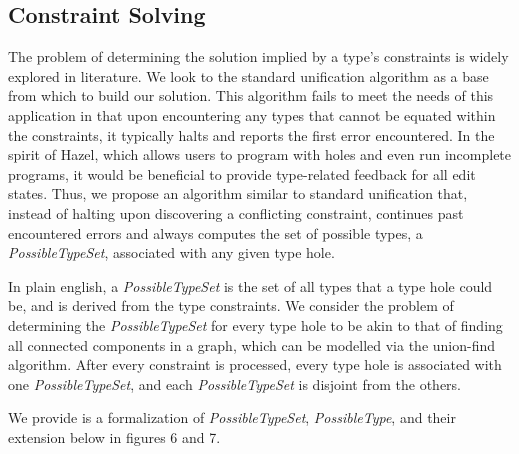 
\usetikzlibrary{positioning,calc}

\subsection{Constraint Solving}
\label{sec:infalg}
The problem of determining the solution implied by a type's constraints is widely explored in literature. We look to the standard unification algorithm \cite{RobinUnification} as a base from which to build our solution. This algorithm fails to meet the needs of this application in that upon encountering any types that cannot be equated within the constraints, it typically halts and reports the first error encountered.
In the spirit of Hazel, which allows users to program with holes and even run incomplete programs, it would be beneficial to provide type-related feedback for all edit states. Thus, we propose an algorithm similar to standard unification that, instead of halting upon discovering a conflicting constraint, continues past encountered errors and always computes the set of possible types, a \textit{PossibleTypeSet}, associated with any given type hole.

In plain english, a \textit{PossibleTypeSet} is the set of all types that a type hole could be, and is derived from the type constraints. We consider the problem of determining the \textit{PossibleTypeSet} for every type hole to be akin to that of finding all connected components in a graph, which can be modelled via the union-find algorithm. After every constraint is processed, every type hole is associated with one \textit{PossibleTypeSet}, and each \textit{PossibleTypeSet} is disjoint from the others.

We provide is a formalization of \textit{PossibleTypeSet}, \textit{PossibleType}, and their extension below in figures 6 and 7.

